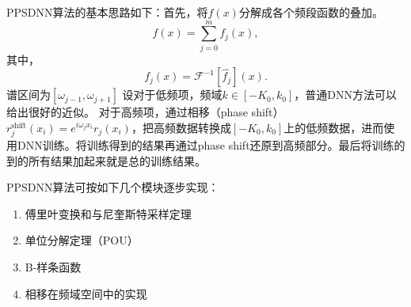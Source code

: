 PPSDNN算法的基本思路如下：首先，将$f(x)$分解成各个频段函数的叠加。
\begin{equation}
f(x)=%
{\displaystyle\sum\limits_{j=0}^{m}}
f_{j}(x), \label{x-decomp}%
\end{equation}
其中，
\[
f_{j}(x)=\mathcal{F}^{-1}[\widehat{f_{j}}](x).
\]
谱区间为$[\omega _{j-1},\omega _{j+1}]$
设对于低频项，频域$k\in [-K_0,k_0]$，普通DNN方法可以给出很好的近似。
对于高频项，通过相移（phase shift）$r_{j}^{\text{shift}}(x_{i})=e^{i\omega_{j}x_{i}}r_{j}(x_{i})$，把高频数据转换成$[-K_0,k_0]$上的低频数据，进而使用DNN训练。将训练得到的结果再通过phase shift还原到高频部分。最后将训练的到的所有结果加起来就是总的训练结果。

PPSDNN算法可按如下几个模块逐步实现：
\begin{enumerate}
    \item 傅里叶变换和与尼奎斯特采样定理\cite{vaidyanathan2001generalizations}
    \item 单位分解定理（POU）
    \item B-样条函数
    \item 相移在频域空间中的实现
\end{enumerate}
